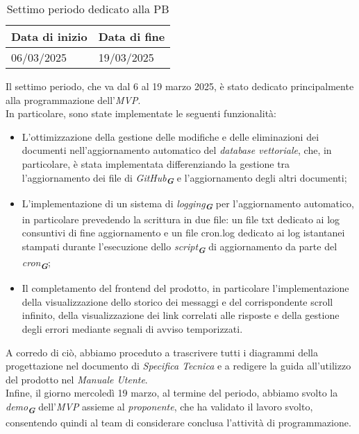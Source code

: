 \label{sec:settimo periodo}
\begin{table}[h!]
    \centering
    \renewcommand{\arraystretch}{1.5} %
    \begin{tabularx}{\textwidth}{|X|X|}\hline
    \rowcolor[HTML]{FFD700} 
    \textbf{Data di inizio} & \textbf{Data di fine} \\ \hline
    06/03/2025 & 19/03/2025 \\ \hline
    \end{tabularx}
    \caption{Settimo periodo dedicato alla PB}
\end{table}
Il settimo periodo, che va dal 6 al 19 marzo 2025, è stato dedicato principalmente alla programmazione dell'\emph{MVP}.\\
In particolare, sono state implementate le seguenti funzionalità:
\begin{itemize}
    \item L'ottimizzazione della gestione delle modifiche e delle eliminazioni dei documenti nell'aggiornamento automatico del \emph{database vettoriale}, che, in particolare, è stata implementata differenziando la gestione tra l'aggiornamento dei file di \emph{GitHub}\textsubscript{\textbf{\textit{G}}} e l'aggiornamento degli altri documenti;
    \item L'implementazione di un sistema di \emph{logging}\textsubscript{\textbf{\textit{G}}} per l'aggiornamento automatico, in particolare prevedendo la scrittura in due file: un file txt dedicato ai log consuntivi di fine aggiornamento e un file cron.log dedicato ai log istantanei stampati durante l'esecuzione dello \emph{script}\textsubscript{\textbf{\textit{G}}} di aggiornamento da parte del \emph{cron}\textsubscript{\textbf{\textit{G}}};
    \item Il completamento del frontend del prodotto, in particolare l'implementazione della visualizzazione dello storico dei messaggi e del corrispondente scroll infinito, della visualizzazione dei link correlati alle risposte e della gestione degli errori mediante segnali di avviso temporizzati.
\end{itemize}
A corredo di ciò, abbiamo proceduto a trascrivere tutti i diagrammi della progettazione nel documento di \emph{Specifica Tecnica} e a redigere la guida all'utilizzo del prodotto nel \emph{Manuale Utente}.\\
Infine, il giorno mercoledì 19 marzo, al termine del periodo, abbiamo svolto la \emph{demo}\textsubscript{\textbf{\textit{G}}} dell'\emph{MVP} assieme al \emph{proponente}, che ha validato il lavoro svolto, consentendo quindi al team di considerare conclusa l'attività di programmazione.

